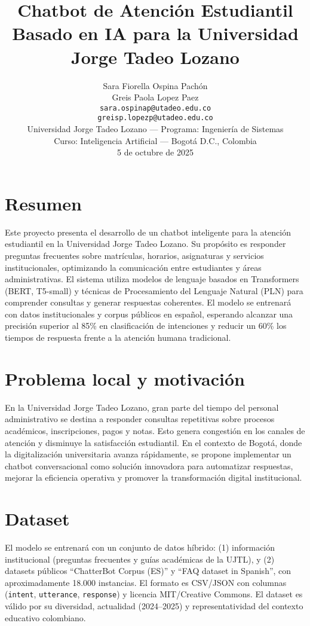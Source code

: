 \documentclass[11pt,letterpaper]{article}
\title{\textbf{Chatbot de Atención Estudiantil Basado en IA para la Universidad Jorge Tadeo Lozano}}
\author{
Sara Fiorella Ospina Pachón \\ 
Greis Paola Lopez Paez \\
\texttt{sara.ospinap@utadeo.edu.co} \\
\texttt{greisp.lopezp@utadeo.edu.co} \\
Universidad Jorge Tadeo Lozano — Programa: Ingeniería de Sistemas \\
Curso: Inteligencia Artificial — Bogotá D.C., Colombia \\
5 de octubre de 2025
}
\date{}
\begin{document}
\maketitle

\section*{Resumen}
Este proyecto presenta el desarrollo de un chatbot inteligente para la atención estudiantil en la Universidad Jorge Tadeo Lozano. Su propósito es responder preguntas frecuentes sobre matrículas, horarios, asignaturas y servicios institucionales, optimizando la comunicación entre estudiantes y áreas administrativas. El sistema utiliza modelos de lenguaje basados en Transformers (BERT, T5-small) y técnicas de Procesamiento del Lenguaje Natural (PLN) para comprender consultas y generar respuestas coherentes. El modelo se entrenará con datos institucionales y corpus públicos en español, esperando alcanzar una precisión superior al 85\% en clasificación de intenciones y reducir un 60\% los tiempos de respuesta frente a la atención humana tradicional.

\section*{Problema local y motivación}
En la Universidad Jorge Tadeo Lozano, gran parte del tiempo del personal administrativo se destina a responder consultas repetitivas sobre procesos académicos, inscripciones, pagos y notas. Esto genera congestión en los canales de atención y disminuye la satisfacción estudiantil. En el contexto de Bogotá, donde la digitalización universitaria avanza rápidamente, se propone implementar un chatbot conversacional como solución innovadora para automatizar respuestas, mejorar la eficiencia operativa y promover la transformación digital institucional.

\section*{Dataset}
El modelo se entrenará con un conjunto de datos híbrido: (1) información institucional (preguntas frecuentes y guías académicas de la UJTL), y (2) datasets públicos “ChatterBot Corpus (ES)” y “FAQ dataset in Spanish”, con aproximadamente 18.000 instancias. El formato es CSV/JSON con columnas (\texttt{intent}, \texttt{utterance}, \texttt{response}) y licencia MIT/Creative Commons. El dataset es válido por su diversidad, actualidad (2024–2025) y representatividad del contexto educativo colombiano.
\end{document}
